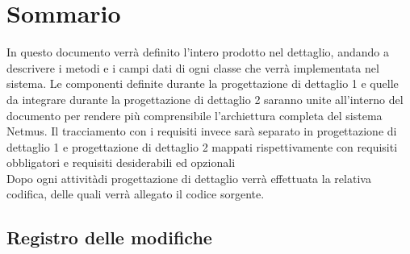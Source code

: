 
\newcommand{\nomedoc}{Definizione Del Prodotto}
\newcommand{\versione}{0.7}
\newcommand{\versioneglossario}{3.0}
\newcommand{\versionenormeprogetto}{3.0}
\newcommand{\versionespecifica}{2.0}
\newcommand{\nomefile}{DefinizioneDelProdotto-\versione.pdf}
\newcommand{\datacreazione}{3 Febbraio 2011}
\newcommand{\datamodifica}{5 Febbraio 2011}
\newcommand{\stato}{formale}
\newcommand{\uso}{esterno}
\newcommand{\redazione}{---}
\newcommand{\verifica}{---}
\newcommand{\approvazione}{---}
\newcommand{\distribuzione}{
VT.G \\
& Prof. Vardanega Tullio\\
& Prof. Cardin Riccardo }







\chapter*{Sommario}
\thispagestyle{fancy}
In questo documento verr\`a definito l'intero prodotto nel dettaglio, andando a
descrivere i metodi e i campi dati di ogni classe che verr\`a implementata nel
sistema. Le componenti definite durante la progettazione di dettaglio 1 e quelle da integrare durante
la progettazione di dettaglio 2 saranno unite all'interno del documento per
rendere pi\`u comprensibile l'archiettura completa del sistema Netmus. Il
tracciamento con i requisiti invece sar\`a separato in progettazione di
dettaglio 1 e progettazione di dettaglio 2 mappati rispettivamente con requisiti
obbligatori e requisiti desiderabili ed opzionali\\Dopo ogni attivit\`adi
progettazione di dettaglio verr\`a effettuata la relativa codifica, delle quali
verr\`a allegato il codice sorgente.

\newpage
\section*{Registro delle modifiche}

